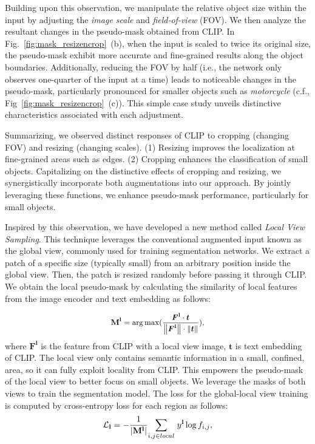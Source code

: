 \documentclass[letterpaper]{article} %
\def\ie{i.e.} \def\Ie{I.e.}
\def\cf{c.f.} \def\Cf{C.f.}
\begin{document}
Building upon this observation, we manipulate the relative object size within the input by adjusting the \emph{image scale} and \emph{field-of-view} (FOV). We then analyze the resultant changes in the pseudo-mask obtained from CLIP. In Fig.~\ref{fig:mask_resizencrop}~(b), when the input is scaled to twice its original size, the pseudo-mask exhibit more accurate and fine-grained results along the object boundaries. Additionally, reducing the FOV by half (\ie, the network only observes one-quarter of the input at a time) leads to noticeable changes in the pseudo-mask, particularly pronounced for smaller objects such as \textit{motorcycle} (\cf, Fig~\ref{fig:mask_resizencrop}~(c)). This simple case study unveils distinctive characteristics associated with each adjustment.

Summarizing, we observed distinct responses of CLIP to cropping (changing FOV) and resizing (changing scales). (1) Resizing improves the localization at fine-grained areas such as edges. (2) Cropping enhances the classification of small objects. Capitalizing on the distinctive effects of cropping and resizing, we synergistically incorporate both augmentations into our approach. By jointly leveraging these functions, we enhance pseudo-mask performance, particularly for small objects.

Inspired by this observation, we have developed a new method called \textit{Local View Sampling}. This technique leverages the conventional augmented input known as the global view, commonly used for training segmentation networks. We extract a patch of a specific size (typically small) from an arbitrary position inside the global view. Then, the patch is resized randomly before passing it through CLIP. We obtain the local pseudo-mask by calculating the similarity of local features from the image encoder and text embedding as follows:

\begin{equation}
\label{eq_local_mask}
{\small
\mathbf{M}^\mathbf{l} = \arg \max(\frac{\boldsymbol{F}^\mathbf{l} \cdot \boldsymbol{t}}{\left \| \boldsymbol{F}^\mathbf{l} \right \| \cdot \left \| \boldsymbol{t} \right \|}),
}
\end{equation} %
%
where $\boldsymbol{F}^\mathbf{l}$ is the feature from CLIP with a local view image, $\boldsymbol{t}$ is text embedding of CLIP. The local view only contains semantic information in a small, confined, area, so it can fully exploit locality from CLIP. This empowers the pseudo-mask of the local view to better focus on small objects. We leverage the masks of both views to train the segmentation model. The loss for the global-local view training is computed by cross-entropy loss for each region as follows:
\begin{equation}
\label{eq_loss_loc}
{\small
\mathcal{L}_\mathbf{l} = - \frac{1}{|\mathbf{M}^\mathbf{l}|} \underset{i,j \in local}{\sum} \text{ } y^\mathbf{l} \log {f_{i,j}},
}
\end{equation}
\end{document}
